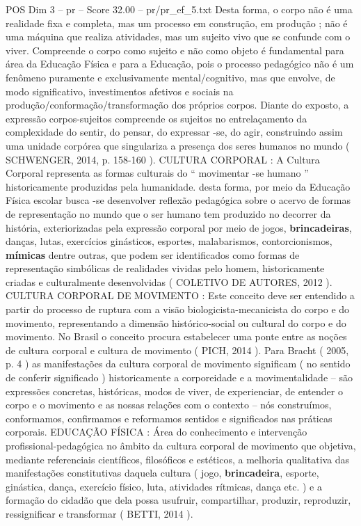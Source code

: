 \begin{textsample}{POS Dim 3 – pr – Score 32.00 – pr/pr\_ef\_5.txt}
Desta forma, o corpo não é uma realidade fixa e completa, mas um processo em construção, em produção ; não é uma máquina que realiza atividades, mas um sujeito vivo que se confunde com o viver.
Compreende o corpo como sujeito e não como objeto é fundamental para área da Educação Física e para a Educação, pois o processo pedagógico não é um fenômeno puramente e exclusivamente mental/cognitivo, mas que envolve, de modo significativo, investimentos afetivos e sociais na produção/conformação/transformação dos próprios corpos.
Diante do exposto, a expressão corpos-sujeitos compreende os sujeitos no entrelaçamento da complexidade do sentir, do pensar, do expressar -se, do agir, construindo assim uma unidade corpórea que singulariza a presença dos seres humanos no mundo ( SCHWENGER, 2014, p. 158-160 ).
CULTURA CORPORAL : A Cultura Corporal representa as formas culturais do “ movimentar -se humano ” historicamente produzidas pela humanidade. desta forma, por meio da Educação Física escolar busca -se desenvolver reflexão pedagógica sobre o acervo de formas de representação no mundo que o ser humano tem produzido no decorrer da história, exteriorizadas pela expressão corporal por meio de jogos, \textbf{brincadeiras}, danças, lutas, exercícios ginásticos, esportes, malabarismos, contorcionismos, \textbf{mímicas} dentre outras, que podem ser identificados como formas de representação simbólicas de realidades vividas pelo homem, historicamente criadas e culturalmente desenvolvidas ( COLETIVO DE AUTORES, 2012 ).
CULTURA CORPORAL DE MOVIMENTO : Este conceito deve ser entendido a partir do processo de ruptura com a visão biologicista-mecanicista do corpo e do movimento, representando a dimensão histórico-social ou cultural do corpo e do movimento.
No Brasil o conceito procura estabelecer uma ponte entre as noções de cultura corporal e cultura de movimento ( PICH, 2014 ).
Para Bracht ( 2005, p. 4 ) as manifestações da cultura corporal de movimento significam ( no sentido de conferir significado ) historicamente a corporeidade e a movimentalidade – são expressões concretas, históricas, modos de viver, de experienciar, de entender o corpo e o movimento e as nossas relações com o contexto – nós construímos, conformamos, confirmamos e reformamos sentidos e significados nas práticas corporais.
EDUCAÇÃO FÍSICA : Área do conhecimento e intervenção profissional-pedagógica no âmbito da cultura corporal de movimento que objetiva, mediante referenciais científicos, filosóficos e estéticos, a melhoria qualitativa das manifestações constitutivas daquela cultura ( jogo, \textbf{brincadeira}, esporte, ginástica, dança, exercício físico, luta, atividades rítmicas, dança etc. ) e a formação do cidadão que dela possa usufruir, compartilhar, produzir, reproduzir, ressignificar e transformar ( BETTI, 2014 ).

\end{textsample}
